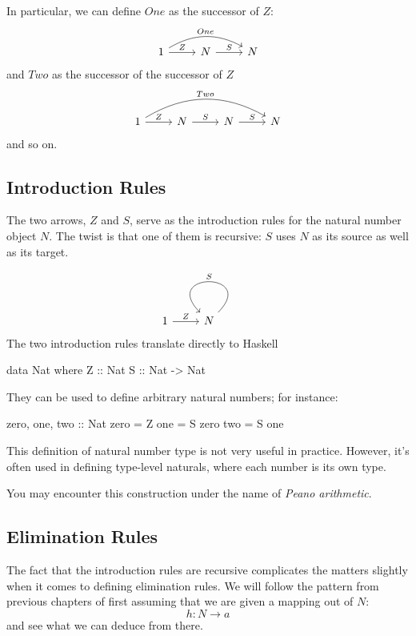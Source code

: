 \documentclass[DaoFP]{subfiles}
\begin{document}
In particular, we can define $One$ as the successor of $Z$:
\[
 \begin{tikzcd}
 1
 \arrow[rr, bend left, "One"]
 \arrow[r, "Z"]
 &N
  \arrow[r, "S"]
&N
  \end{tikzcd}
\]
and $Two$ as the successor of the successor of $Z$
\[
 \begin{tikzcd}
 1
 \arrow[rrr, bend left, "Two"]
 \arrow[r, "Z"]
 &N
  \arrow[r, "S"]
&N
  \arrow[r, "S"]
 &N
 \end{tikzcd}
\]
and so on.

\subsection{Introduction Rules}

The two arrows, $Z$ and $S$, serve as the introduction rules for the natural number object $N$. The twist is that one of them is recursive: $S$ uses $N$ as its source as well as its target.

\[
 \begin{tikzcd}
 1
 \arrow[r, "Z"]
 &N
 \arrow[loop, "S"']
 \end{tikzcd}
\]
The two introduction rules translate directly to Haskell


\begin{haskell}
data Nat where
  Z :: Nat
  S :: Nat -> Nat
\end{haskell}
They can be used to define arbitrary natural numbers; for instance:

\begin{haskell}
zero, one, two :: Nat
zero = Z
one  = S zero
two  = S one
\end{haskell}

This definition of natural number type is not very useful in practice. However, it's often used in defining type-level naturals, where each number is its own type. 

You may encounter this construction under the name of \emph{Peano arithmetic}.

\subsection{Elimination Rules}

The fact that the introduction rules are recursive complicates the matters slightly when it comes to defining elimination rules. We will follow the pattern from previous chapters of first assuming that we are given a mapping out of $N$:
\[ h \colon N \to a \]
and see what we can deduce from there. 
\end{document}

